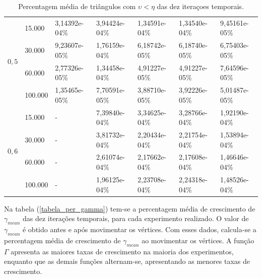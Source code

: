 \begin{table}[!ht]
\begin{center}
\begin{tabular}{|l|l|l|l|l|l|l|}
\hline %
\multirow{4}{*}{$0,5$}
& 15.000 & 3,14392e-04\% & 3,94424e-04\% & 1,34591e-04\% & 1,34540e-04\% & 9,45161e-05\% \\
& 30.000 & 9,23607e-05\% & 1,76159e-04\% & 6,18742e-05\% & 6,18740e-05\% & 6,75403e-05\% \\
& 60.000 & 2,77326e-05\% & 1,34458e-04\% & 4,91227e-05\% & 4,91227e-05\% & 7,64596e-05\% \\
& 100.000 & 1,35465e-05\% & 7,70591e-05\% & 3,88710e-05\% & 3,92226e-05\% & 5,01487e-05\% \\
\hline %
\multirow{4}{*}{$0,6$}
& 15.000 & - & 7,39840e-04\% & 3,34625e-04\% & 3,28766e-04\% & 1,92190e-04\% \\
& 30.000 & - & 3,81732e-04\% & 2,20434e-04\% & 2,21754e-04\% & 1,53894e-04\% \\
& 60.000 & - & 2,61074e-04\% & 2,17662e-04\% & 2,17608e-04\% & 1,46646e-04\% \\
& 100.000 & - & 1,96125e-04\% & 2,23708e-04\% & 2,24318e-04\% & 1,48526e-04\% \\
\hline %
\end{tabular}%
\end{center}
\caption{Percentagem média de triângulos com $\upsilon < \eta$ das dez iteraçoes temporais.} %
\label{tabela_per_upsilon}
\end{table}

Na tabela (\ref{tabela_per_gamma}) tem-se a percentagem média de crescimento de $\gamma_{mean}$ das dez iterações temporais, para cada experimento realizado. O valor de $\gamma_{mean}$ é obtido antes e após movimentar os vértices. Com esses dados, calcula-se a percentagem média de crescimento de $\gamma_{mean}$ ao movimentar os vértices. A função $\Gamma$ apresenta as maiores taxas de crescimento na maioria dos experimentos, enquanto que as demais funções alternam-se, apresentando as menores taxas de crescimento.

